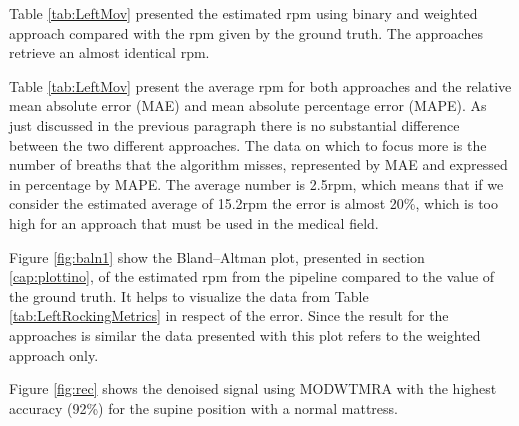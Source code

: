 Table \ref{tab:LeftMov} presented the estimated rpm using binary and weighted approach compared with the rpm given by the ground truth. The approaches retrieve an almost identical rpm. 

\vspace{0.5cm}


Table \ref{tab:LeftMov} present the average rpm for both approaches  
and the relative mean absolute error (MAE) and mean absolute percentage error (MAPE). As just discussed in the previous paragraph there is no substantial difference between the two different approaches. The data on which to focus more is the number of breaths that the algorithm misses, represented by MAE and expressed in percentage by MAPE. The average number is 2.5rpm, which means that if we consider the estimated average of 15.2rpm the error is almost 20\%, which is too high for an approach that must be used in the medical field.



Figure \ref{fig:baln1} show the Bland–Altman plot, presented in section \ref{cap:plottino}, of the estimated rpm from the pipeline compared to the value of the ground truth. It helps to visualize the data from Table \ref{tab:LeftRockingMetrics} in respect of the error. Since the result for the approaches is similar the data presented with this plot refers to the weighted approach only.

Figure \ref{fig:rec} shows the denoised signal using MODWTMRA with the highest accuracy (92\%) for the supine position with a normal mattress.

